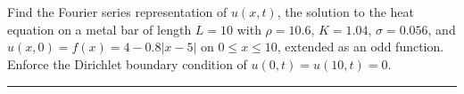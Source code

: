 \documentclass[10pt]{article}
\begin{document}
\newpage

\section{\underline{}}
\label{sec: Problem 2}

\noindent
Find the Fourier series representation of $ u(x,t) $,
the solution to the heat equation on a metal bar of length $ L = 10 $
with $ \rho = 10.6 $, $ K = 1.04 $, $ \sigma = 0.056 $, and $ u(x,0) = f(x) = 4 - 0.8|x-5| $
on $ 0 \le x \le 10 $, extended as an odd function.
Enforce the Dirichlet boundary condition of $ u(0,t) = u(10,t) = 0 $. \\
\vspace{2.5mm}

\hrule

\vspace{7.5mm}
\end{document}
